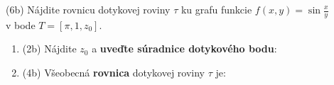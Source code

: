 \pr (6b) Nájdite rovnicu dotykovej roviny $\tau$ ku grafu funkcie
$\displaystyle f(x,y)=\sin\frac{x}{y}$ \\
\hspace*{1.4cm} v bode $T=\left[\pi,1, z_{0}\right]$.

\begin{enumerate}
\item[] (2b) Nájdite $z_0$ a  \textbf{uveďte súradnice dotykového bodu}: \gr
\item[] (4b) Všeobecná \textbf{rovnica} dotykovej roviny $\tau$ je:\gr
\end{enumerate}
